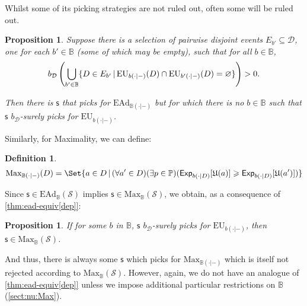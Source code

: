 \documentclass[a4paper]{article}
\newtheorem{definition}{Definition}
\newtheorem{proposition}[theorem]{Proposition}
\renewcommand\P{\mathbb{P}} %
\newcommand\Exp{\mathsf{Exp}}
\newcommand\EU{\mathrm{EU}}
\newcommand\EAd{\mathrm{EAd}}
\newcommand\U{\mathfrak{U}} %
\newcommand\Maximality{\mathrm{Max}}
\newcommand{\Decs}{\mathcal{D}}
\renewcommand\S{\mathcal{S}}
\newcommand\s{\mathsf{s}}
\newcommand{\IB}{\mathbb{B}}
\newcommand{\IP}{\P}
\renewcommand{\color}[1]{}
\newenvironment{colored}[1]{\leavevmode\color{#1}}{}
\newcommand{\Strategies}{\S}
\newcommand\SetDelimiter[1][]{
	\nonscript\,#1\vert \allowbreak \nonscript\,\mathopen{}}
\providecommand\given{\SetDelimiter}
\renewcommand{\emptyset}{\varnothing}
\renewcommand{\geq}{\geqslant}
\newenvironment{CCM rewritten}
{\begingroup\color{blue}} %
{\endgroup}              %
\begin{document}
	Whilst some of its picking strategies are not ruled out, often some will be ruled out. 
		
\begin{proposition}\label{thm:ead-existsimpermissible[dep]}
Suppose there is a selection of pairwise disjoint events $E_{b'}\subseteq\Decs$, one for each $b'\in\IB$ (some of which may be empty),  such that for all $b\in\IB$, $$b_\Decs\left(\bigcup_{b'\in\IB}\{D\in E_{b'}\given \EU_{b(\cdot|-)}(D)\cap \EU_{b'(\cdot|-)}(D)=\emptyset\}\right)>0.$$

Then there is $\s$ that picks for $\EAd_{\IB(\cdot|-)}$ but for which there is no $b\in\IB$ such that $\s$  $b_\Decs$-surely picks for $\EU_{b(\cdot|-)}$. 
\end{proposition}

Similarly, for Maximality, we can define: 
\begin{definition}
	$$\Maximality_{\IB(\cdot|-)}(D) = \Set{a \in D \given (\forall a' \in D)(\exists p\in\IP)(\Exp_{b(\cdot|D)}[\U(a)]\geq\Exp_{b(\cdot|D)}[\U(a')])}
	$$\end{definition}
	Since $\s\in\EAd_\IB(\S)$ implies $\s\in\Maximality_\IB(\S)$, we obtain, as a consequence of \cref{thm:ead-equiv[dep]}:
	\begin{proposition}\label{thm:max-suff[dep]}
	If for some $b$ in $\IB$, $\s$ $b_\Decs$-surely picks for $\EU_{b(\cdot|-)}$, then $\s\in\Maximality_\IB(\Strategies)$. 
\end{proposition}And thus, there is always some $\s$ which picks for $\Maximality_{\IB(\cdot|-)}$ which is itself not rejected according to $\Maximality_\IB(\Strategies)$. However, again, we do not have %
an analogue of \cref{thm:ead-equiv[dep]} unless we impose additional particular restrictions on $\IB$ (\cref{sect:nu:Max}).
\end{document}
